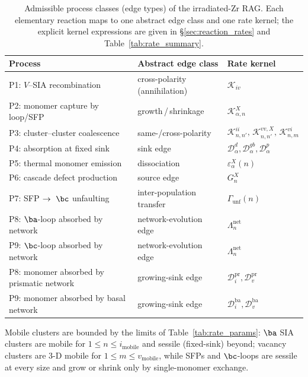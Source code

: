 \begin{table}[htbp]
\centering
\caption{Admissible process classes (edge types) of the irradiated-Zr
\textsc{RAG}. Each elementary reaction maps to one abstract edge class
and one rate kernel; the explicit kernel expressions are given in
\S\ref{sec:reaction_rates} and Table~\ref{tab:rate_summary}.}
\label{tab:rag_processes}
\renewcommand{\arraystretch}{1.15}
\begin{tabular}{@{}lll@{}}
\toprule
\textbf{Process} & \textbf{Abstract edge class} & \textbf{Rate kernel} \\
\midrule
P1: $V$--SIA recombination & cross-polarity (annihilation) & $\mathcal{K}_{iv}$ \\
P2: monomer capture by loop/SFP & growth\,/\,shrinkage & $\mathcal{K}_{\alpha,n}^{X}$ \\
P3: cluster--cluster coalescence & same-/cross-polarity & $\mathcal{K}_{n,n'}^{ii},\,\mathcal{K}_{n,n'}^{vv,X},\,\mathcal{K}_{n,m}^{vi}$ \\
P4: absorption at fixed sink & sink edge & $\mathcal{D}_\alpha^{d},\mathcal{D}_\alpha^{gb},\mathcal{D}_\alpha^{p}$ \\
P5: thermal monomer emission & dissociation & $\varepsilon_\alpha^{X}(n)$ \\
P6: cascade defect production & source edge & $G_n^{X}$ \\
P7: SFP $\to\ \bc$ unfaulting & inter-population transfer & $\Gamma_{\mathrm{unf}}(n)$ \\
P8: $\ba$-loop absorbed by network & network-evolution edge & $\Lambda_n^{\mathrm{net}}$ \\
P9: $\bc$-loop absorbed by network & network-evolution edge & $\Lambda_n^{\mathrm{net}}$ \\
P8: monomer absorbed by prismatic network & growing-sink edge & $\mathcal{D}_i^{\mathrm{pr}},\mathcal{D}_v^{\mathrm{pr}}$ \\
P9: monomer absorbed by basal network & growing-sink edge & $\mathcal{D}_i^{\mathrm{ba}},\mathcal{D}_v^{\mathrm{ba}}$ \\
\bottomrule
\end{tabular}
\end{table}

Mobile clusters are bounded by the limits of Table~\ref{tab:rate_params}:
$\ba$ SIA clusters are mobile for $1\le n\le i_{\mathrm{mobile}}$ and
sessile (fixed-sink) beyond; vacancy clusters are 3-D mobile for
$1\le m\le v_{\mathrm{mobile}}$, while SFPs and $\bc$-loops are sessile
at every size and grow or shrink only by single-monomer exchange.

